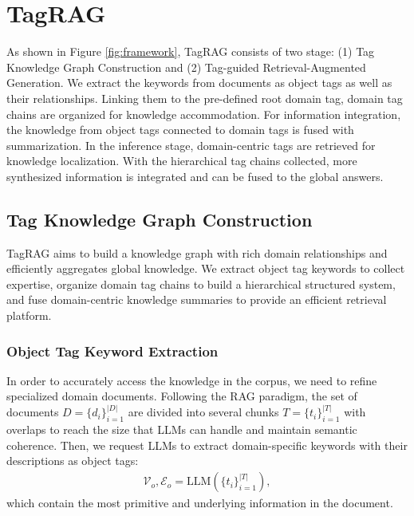 \documentclass[11pt]{article}
\begin{document}
\section{TagRAG}
As shown in Figure \ref{fig:framework}, TagRAG consists of two stage: (1) Tag Knowledge Graph Construction and (2) Tag-guided Retrieval-Augmented Generation. 
We extract the keywords from documents as object tags as well as their relationships. Linking them to the pre-defined root domain tag, domain tag chains are organized for knowledge accommodation. 
For information integration, the knowledge from object tags connected to domain tags is fused with summarization.
In the inference stage, domain-centric tags are retrieved for knowledge localization. With the hierarchical tag chains collected, more synthesized information is integrated and can be fused to the global answers.

\subsection{Tag Knowledge Graph Construction}
TagRAG aims to build a knowledge graph with rich domain relationships and efficiently aggregates global knowledge.
We extract object tag keywords to collect expertise, organize domain tag chains to build a hierarchical structured system, and fuse domain-centric knowledge summaries to provide an efficient retrieval platform.


\subsubsection{Object Tag Keyword Extraction}
In order to accurately access the knowledge in the corpus, we need to refine specialized domain documents.
Following the RAG paradigm, the set of documents $D=\{d_i\}_{i=1}^{\left | D \right | }$ are divided into several chunks $T=\{t_i\}_{i=1}^{\left | T \right | }$ with overlaps to reach the size that LLMs can handle and maintain semantic coherence.
Then, we request LLMs to extract domain-specific keywords with their descriptions as object tags:
\begin{align*}
    \mathcal{V}_o, \mathcal{E}_o =  \text{LLM}(\{t_i\}_{i=1}^{\left | T \right | }),
\end{align*}
which contain the most primitive and underlying information in the document.
\end{document}
